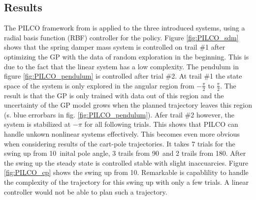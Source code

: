 \documentclass[letterpaper, 10 pt, conference]{ieeeconf}  %
\begin{document}
\subsection{Results}
The PILCO framework from \cite{PILCO_web} is applied to the three introduced systems, %
using a radial basis function (RBF) controller for the policy. 
Figure \ref{fig:PILCO_sdm} shows that the spring damper mass system is controlled on trail \#1 after optimizing the GP with the data of random exploration in the beginning. This is due to the fact that the linear system has a low complexity. 
The pendulum in figure \ref{fig:PILCO_pendulum} is controlled after trial \#2. At trail \#1 the state space of the system is only explored in the angular region from $-\frac{\pi}{2}$ to $\frac{\pi}{2}$. The result is that the GP is only trained with data out of this region and the uncertainty of the GP model grows when the planned trajectory leaves this region (s. blue errorbars in fig. \ref{fig:PILCO_pendulum}). Afer trail \#2 however, the system is stabilized at $-\pi$ for all following trials.
This shows that PILCO can handle unkown nonlinear systems effectively. This becomes even more obvious when considering results of the cart-pole trajectories. It takes 7 trials for the swing up from 10\textdegree \, inital pole angle, 3 trails from 90\textdegree \, and 2 trails from 180\textdegree . After the swing up the steady state is controlled stable with slight inaccuarcies. Figure \ref{fig:PILCO_cp} shows the swing up from 10\textdegree. Remarkable is capablility to handle the complexity of the trajectory for this swing up with only a few trials.
A linear controller would not be able to plan such a trajectory.  %
\end{document}
